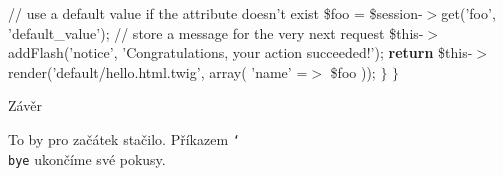  \codetexNewline
{} {\localcolor \Grey // use a default value if the attribute doesn't exist}\codetexNewline
{} \$foo = \$session-$>$get({\localcolor \Cyan 'foo'}, {\localcolor \Cyan 'default\_value'});\codetexNewline
{} \codetexNewline
{} {\localcolor \Grey // store a message for the very next request}\codetexNewline
{} \$this-$>$addFlash({\localcolor \Cyan 'notice'}, {\localcolor \Cyan 'Congratulations, your action succeeded!'});\codetexNewline
{} \codetexNewline
{} {\bf {\localcolor \Green return}} \$this-$>$render({\localcolor \Cyan 'default/hello.html.twig'}, array(\codetexNewline
{} {\localcolor \Cyan 'name'} =$>$ \$foo\codetexNewline
{} ));\codetexNewline
{} $\}$\codetexNewline
{} $\}$\codetexNewline
\codetexNewline \typoscale[1250/100000]
\bigbreak

\nadpis Závěr

To by pro začátek stačilo. Příkazem {\tt\char`\\bye} ukončíme své pokusy.
\bye

